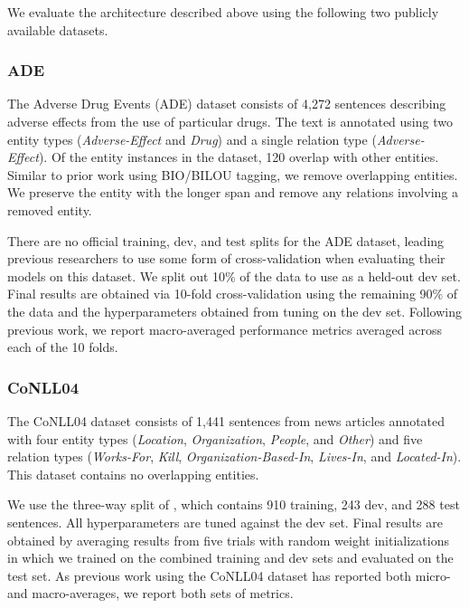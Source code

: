 \documentclass{article}
\begin{document}
We evaluate the architecture described above using the following two publicly available datasets.

\subsubsection{ADE}
The Adverse Drug Events (ADE) dataset \cite{gurulingappa2012development} consists of 4,272 sentences describing adverse effects from the use of particular drugs. The text is annotated using two entity types ({\em Adverse-Effect} and {\em Drug}) and a single relation type ({\em Adverse-Effect}). Of the entity instances in the dataset, 120 overlap with other entities. Similar to prior work using BIO/BILOU tagging, we remove overlapping entities. We preserve the entity with the longer span and remove any relations involving a removed entity. 

There are no official training, dev, and test splits for the ADE dataset, leading previous researchers to use some form of cross-validation when evaluating their models on this dataset. We split out 10\% of the data to use as a held-out dev set. Final results are obtained via 10-fold cross-validation using the remaining 90\% of the data and the hyperparameters obtained from tuning on the dev set. Following previous work, we report macro-averaged performance metrics averaged across each of the 10 folds.

\subsubsection{CoNLL04}

The CoNLL04 dataset \cite{roth2004linear} consists of 1,441 sentences from news articles annotated with four entity types ({\em Location}, {\em Organization}, {\em People}, and {\em Other}) and five relation types ({\em Works-For}, {\em Kill}, {\em Organization-Based-In}, {\em Lives-In}, and {\em Located-In}). This dataset contains no overlapping entities.

We use the three-way split of \cite{gupta-etal-2016-table}, which contains 910 training, 243 dev, and 288 test sentences. All hyperparameters are tuned against the dev set. Final results are obtained by averaging results from five trials with random weight initializations in which we trained on the combined training and dev sets and evaluated on the test set. As previous work using the CoNLL04 dataset has reported both micro- and macro-averages, we report both sets of metrics.
\end{document}
